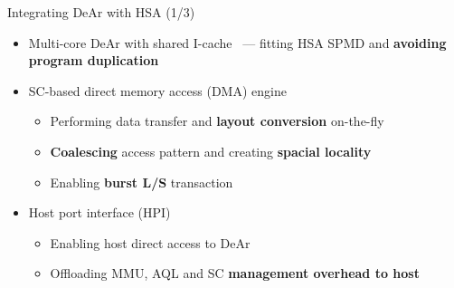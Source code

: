 \documentclass{beamer}
\begin{document}
\begin{CJK}{UTF8}{bkai}
            \begin{frame}{Integrating DeAr with HSA (1/3)}
                \begin{itemize}
                    \item <2-> {Multi-core DeAr with shared I-cache~ --- fitting HSA SPMD and \textbf{avoiding program duplication}}
                    \item <3-> {SC-based direct memory access (DMA) engine~
                            \begin{itemize}
                                \item Performing data transfer and \textbf{layout conversion} on-the-fly
                                \item \textbf{Coalescing} access pattern and creating \textbf{spacial locality}
                                \item Enabling \textbf{burst L/S} transaction
                            \end{itemize}
                        }
                    \item <4-> {Host port interface (HPI)~
                            \begin{itemize}
                                \item Enabling host direct access to DeAr
                                \item Offloading MMU, AQL and SC \textbf{management overhead to host}
                            \end{itemize}
                        }
                \end{itemize}
            \end{frame}


\end{CJK}
\end{document}
